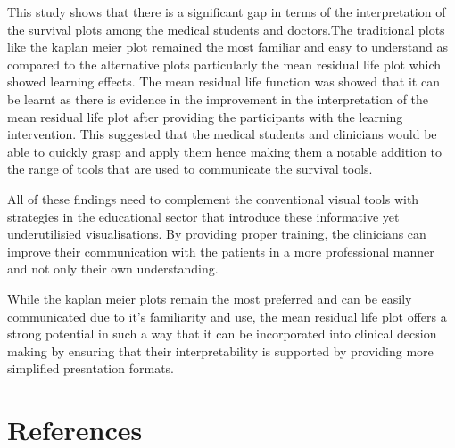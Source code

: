 \documentclass{article}
\begin{document}
This study shows that there is a significant gap in terms of the interpretation of the survival plots among the medical students and doctors.The traditional plots like the kaplan meier plot remained the most familiar and easy to understand as compared to the alternative plots particularly the mean residual life plot which showed learning effects. The mean residual life function was showed that it can be learnt as there is evidence in the improvement in the interpretation of the mean residual life plot after providing the participants with the learning intervention. This suggested that the medical students and clinicians would be able to quickly grasp and apply them hence making them a notable addition to the range of tools that are used to communicate the survival tools.

All of these findings need to complement the conventional visual tools with strategies in the educational sector that introduce these informative yet underutilisied visualisations. By providing proper training, the clinicians can improve their communication with the patients in a more professional manner and not only their own understanding.

While the kaplan meier plots remain the most preferred and can be easily communicated due to it's familiarity and use, the mean residual life plot offers a strong potential
in such a way that it can be incorporated into clinical decsion making by ensuring that their interpretability is supported by providing more simplified presntation formats.

\section*{References}\label{references}
\end{document}
